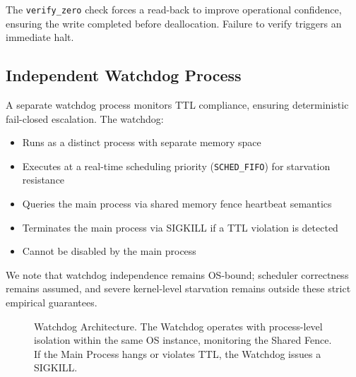 \documentclass[conference]{IEEEtran}
\begin{document}
The \texttt{verify\_zero} check forces a read-back to improve operational confidence, ensuring the write completed before deallocation. Failure to verify triggers an immediate halt.

\subsection{Independent Watchdog Process}
A separate watchdog process monitors TTL compliance, ensuring deterministic fail-closed escalation. The watchdog:
\begin{itemize}
    \item Runs as a distinct process with separate memory space
    \item Executes at a real-time scheduling priority (\texttt{SCHED\_FIFO}) for starvation resistance
    \item Queries the main process via shared memory fence heartbeat semantics
    \item Terminates the main process via SIGKILL if a TTL violation is detected
    \item Cannot be disabled by the main process
\end{itemize}
We note that watchdog independence remains OS-bound; scheduler correctness remains assumed, and severe kernel-level starvation remains outside these strict empirical guarantees.

\begin{figure}[htbp]
\centering
{}
\caption{Watchdog Architecture. The Watchdog operates with process-level isolation within the same OS instance, monitoring the Shared Fence. If the Main Process hangs or violates TTL, the Watchdog issues a SIGKILL.}
\label{fig:watchdog}
\end{figure}
\end{document}
